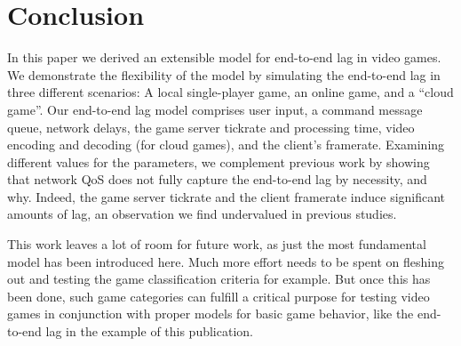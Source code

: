 \section{Conclusion}
\label{sec:conclusion}


In this paper we derived an extensible model for end-to-end lag in 
video games. We demonstrate the flexibility of the model by simulating 
the end-to-end lag in three different scenarios: A local single-player 
game, an online game, and a ``cloud game''. 
Our end-to-end lag model comprises user input, a command message queue, 
network delays, the game server tickrate and processing time, video 
encoding and decoding (for cloud games), and the client's framerate. 
Examining different values for the parameters, we complement previous 
work by showing that network \acrfull{QoS} does not fully capture the 
end-to-end lag by necessity, and why. Indeed, the game server tickrate and 
the client framerate induce significant amounts of lag, 
an observation we find undervalued in previous studies.



This work leaves a lot of room for future work, as just the most fundamental model has been introduced here. Much more effort needs to be spent on fleshing out and testing the game classification criteria for example. But once this has been done, such game categories can fulfill a critical purpose for testing video games in conjunction with proper models for basic game behavior, like the end-to-end lag in the example of this publication.
